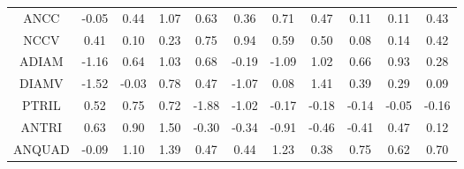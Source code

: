 \documentclass[11pt,a4paper]{report}
\begin{document}
\begin{longtable}{ | c || c | c | c | c | c | c | c | c | c || c |}
ANCC &  \cellcolor[HTML]{FFFFFF} -0.05 &  \cellcolor[HTML]{F7F7FF} 0.44 &  \cellcolor[HTML]{E7E7FF} 1.07 &  \cellcolor[HTML]{EFEFFF} 0.63 &  \cellcolor[HTML]{F7F7FF} 0.36 &  \cellcolor[HTML]{EFEFFF} 0.71 &  \cellcolor[HTML]{F7F7FF} 0.47 &  \cellcolor[HTML]{FFFFFF} 0.11 &  \cellcolor[HTML]{FFFFFF} 0.11 &  \cellcolor[HTML]{F7F7FF} 0.43 \\
NCCV &  \cellcolor[HTML]{F7F7FF} 0.41 &  \cellcolor[HTML]{FFFFFF} 0.10 &  \cellcolor[HTML]{F7F7FF} 0.23 &  \cellcolor[HTML]{EFEFFF} 0.75 &  \cellcolor[HTML]{E7E7FF} 0.94 &  \cellcolor[HTML]{EFEFFF} 0.59 &  \cellcolor[HTML]{EFEFFF} 0.50 &  \cellcolor[HTML]{FFFFFF} 0.08 &  \cellcolor[HTML]{FFFFFF} 0.14 &  \cellcolor[HTML]{F7F7FF} 0.42 \\
ADIAM &  \cellcolor[HTML]{FFDFDF} -1.16 &  \cellcolor[HTML]{EFEFFF} 0.64 &  \cellcolor[HTML]{E7E7FF} 1.03 &  \cellcolor[HTML]{EFEFFF} 0.68 &  \cellcolor[HTML]{FFF7F7} -0.19 &  \cellcolor[HTML]{FFE7E7} -1.09 &  \cellcolor[HTML]{E7E7FF} 1.02 &  \cellcolor[HTML]{EFEFFF} 0.66 &  \cellcolor[HTML]{E7E7FF} 0.93 &  \cellcolor[HTML]{F7F7FF} 0.28 \\
DIAMV &  \cellcolor[HTML]{FFD7D7} -1.52 &  \cellcolor[HTML]{FFFFFF} -0.03 &  \cellcolor[HTML]{EFEFFF} 0.78 &  \cellcolor[HTML]{F7F7FF} 0.47 &  \cellcolor[HTML]{FFE7E7} -1.07 &  \cellcolor[HTML]{FFFFFF} 0.08 &  \cellcolor[HTML]{DFDFFF} 1.41 &  \cellcolor[HTML]{F7F7FF} 0.39 &  \cellcolor[HTML]{F7F7FF} 0.29 &  \cellcolor[HTML]{FFFFFF} 0.09 \\
PTRIL &  \cellcolor[HTML]{EFEFFF} 0.52 &  \cellcolor[HTML]{EFEFFF} 0.75 &  \cellcolor[HTML]{EFEFFF} 0.72 &  \cellcolor[HTML]{FFCFCF} -1.88 &  \cellcolor[HTML]{FFE7E7} -1.02 &  \cellcolor[HTML]{FFF7F7} -0.17 &  \cellcolor[HTML]{FFF7F7} -0.18 &  \cellcolor[HTML]{FFFFFF} -0.14 &  \cellcolor[HTML]{FFFFFF} -0.05 &  \cellcolor[HTML]{FFF7F7} -0.16 \\
ANTRI &  \cellcolor[HTML]{EFEFFF} 0.63 &  \cellcolor[HTML]{E7E7FF} 0.90 &  \cellcolor[HTML]{D7D7FF} 1.50 &  \cellcolor[HTML]{FFF7F7} -0.30 &  \cellcolor[HTML]{FFF7F7} -0.34 &  \cellcolor[HTML]{FFE7E7} -0.91 &  \cellcolor[HTML]{FFF7F7} -0.46 &  \cellcolor[HTML]{FFF7F7} -0.41 &  \cellcolor[HTML]{F7F7FF} 0.47 &  \cellcolor[HTML]{FFFFFF} 0.12 \\
ANQUAD &  \cellcolor[HTML]{FFFFFF} -0.09 &  \cellcolor[HTML]{E7E7FF} 1.10 &  \cellcolor[HTML]{DFDFFF} 1.39 &  \cellcolor[HTML]{F7F7FF} 0.47 &  \cellcolor[HTML]{F7F7FF} 0.44 &  \cellcolor[HTML]{DFDFFF} 1.23 &  \cellcolor[HTML]{F7F7FF} 0.38 &  \cellcolor[HTML]{EFEFFF} 0.75 &  \cellcolor[HTML]{EFEFFF} 0.62 &  \cellcolor[HTML]{EFEFFF} 0.70 \\

\end{longtable}
\end{document}
